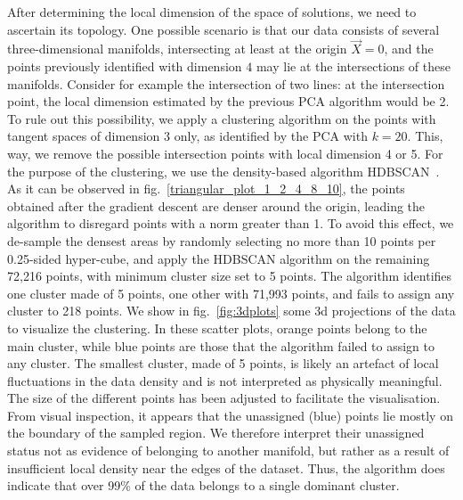 \documentclass[11pt,a4paper]{article}
\begin{document}
	After determining the local dimension of the space of solutions, we need to ascertain its topology. 
One possible scenario is that our data consists of several three-dimensional manifolds, intersecting at least at the origin $\vec{X}=0$, and the points previously identified with dimension $4$ may lie at the intersections of these manifolds. 
Consider for example the intersection of two lines: at the intersection point, the local dimension estimated by the previous PCA algorithm would be 2. 
To rule out this possibility, we apply a clustering algorithm on the points with tangent spaces of dimension 3 only, as identified by the PCA with $k=20$. 
This, way, we remove the possible intersection points with local dimension 4 or 5. 
For the purpose of the clustering, we use the density-based algorithm HDBSCAN~\cite{10.1007/978-3-642-37456-2_14}. 
As it can be observed in fig.~\ref{triangular_plot_1_2_4_8_10}, the points obtained after the gradient descent are denser around the origin, leading the algorithm to disregard points with a norm greater than 1. 
To avoid this effect, we de-sample the densest areas by randomly selecting no more than 10 points per 0.25-sided hyper-cube, and apply the HDBSCAN algorithm on the remaining 72,216 points, with minimum cluster size set to 5 points. 
The algorithm identifies one cluster made of 5 points, one other with 71,993 points, and fails to assign any cluster to 218 points. We show in fig.~\ref{fig:3dplots} some 3d projections of the data to visualize the clustering. In these scatter plots, orange points belong to the main cluster, while blue points are those that the algorithm failed to assign to any cluster. The smallest cluster, made of 5 points, is likely an artefact of local fluctuations in the data density and is not interpreted as physically meaningful. The size of the different points has been adjusted to facilitate the visualisation. From visual inspection, it appears that the unassigned (blue) points lie mostly on the boundary of the sampled region. We therefore interpret their unassigned status not as evidence of belonging to another manifold, but rather as a result of insufficient local density near the edges of the dataset. Thus, the algorithm does indicate that over 99\% of the data belongs to a single dominant cluster.
\end{document}
